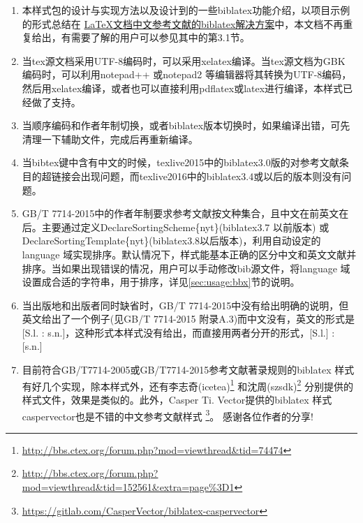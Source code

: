 \begin{enumerate}
  \item 本样式包的设计与实现方法以及设计到的一些biblatex功能介绍，以项目示例的形式总结在
  \href{https://github.com/hushidong/biblatex-solution-to-latex-bibliography}{\LaTeX 文档中文参考文献的biblatex解决方案}中，本文档不再重复给出，有需要了解的用户可以参见其中的第3.1节。

  \item 当tex源文档采用UTF-8编码时，可以采用xelatex编译。当tex源文档为GBK 编码时，可以利用notepad++ 或notepad2 等编辑器将其转换为UTF-8编码，然后用xelatex编译，或者也可以直接利用pdflatex或latex进行编译，本样式已经做了支持。

  \item 当顺序编码和作者年制切换，或者biblatex版本切换时，如果编译出错，可先清理一下辅助文件，完成后再重新编译。

  \item 当bibtex键中含有中文的时候，texlive2015中的biblatex3.0版的对参考文献条目的超链接会出现问题，而texlive2016中的biblatex3.4或以后的版本则没有问题。

  \item GB/T 7714-2015中的作者年制要求参考文献按文种集合，且中文在前英文在后。主要通过定义DeclareSortingScheme\{nyt\}(biblatex3.7 以前版本) 或DeclareSortingTemplate\{nyt\}(biblatex3.8以后版本)，利用自动设定的language 域实现排序。默认情况下，样式能基本正确的区分中文和英文文献并排序。当如果出现错误的情况，用户可以手动修改bib源文件，将language 域设置成合适的字符串，用于排序，详见\ref{sec:usage:bbx}节的说明。


  \item 当出版地和出版者同时缺省时，GB/T 7714-2015中没有给出明确的说明，但英文给出了一个例子(见GB/T 7714-2015 附录A.3)而中文没有，英文的形式是[S.l. : s.n.]，这种形式本样式没有给出，而直接用两者分开的形式，[S.l.] : [s.n.]


  \item 目前符合GB/T7714-2005或GB/T7714-2015参考文献著录规则的biblatex 样式有好几个实现，除本样式外，还有李志奇(icetea)\footnote{\url{http://bbs.ctex.org/forum.php?mod=viewthread&tid=74474}} 和沈周(szsdk)\footnote{\url{http://bbs.ctex.org/forum.php?mod=viewthread&tid=152561&extra=page\%3D1}} 分别提供的样式文件，效果是类似的。此外，Casper Ti. Vector提供的biblatex 样式caspervector也是不错的中文参考文献样式
      \footnote{\url{https://gitlab.com/CasperVector/biblatex-caspervector}}。 感谢各位作者的分享!


\end{enumerate}
